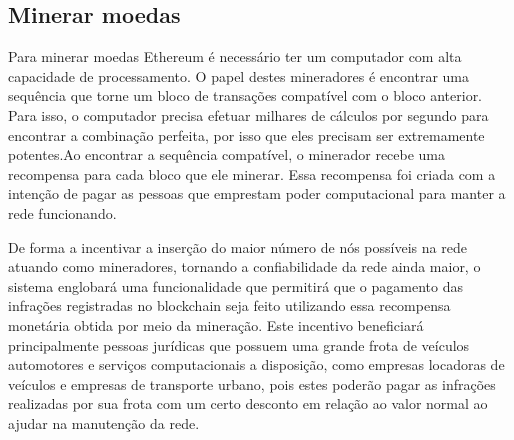         
\subsection{Minerar moedas}

Para minerar moedas Ethereum é necessário ter um computador com alta capacidade de processamento. O papel destes mineradores é encontrar uma sequência que torne um bloco de transações compatível com o bloco anterior. Para isso, o computador precisa efetuar milhares de cálculos por segundo para encontrar a combinação perfeita, por isso que eles precisam ser extremamente potentes.Ao encontrar a sequência compatível, o minerador recebe uma recompensa para cada bloco que ele minerar. Essa recompensa foi criada com a intenção de pagar as pessoas que emprestam poder computacional para manter a rede funcionando.

De forma a incentivar a inserção do maior número de nós possíveis na rede atuando como mineradores, tornando a confiabilidade da rede ainda maior, o sistema englobará uma funcionalidade que permitirá que o pagamento das infrações registradas no blockchain seja feito utilizando essa recompensa monetária obtida por meio da mineração. Este incentivo beneficiará principalmente pessoas jurídicas que possuem uma grande frota de veículos automotores e serviços computacionais a disposição, como empresas locadoras de veículos e empresas de transporte urbano, pois estes poderão pagar as infrações realizadas por sua frota com um certo desconto em relação ao valor normal ao ajudar na manutenção da rede.
